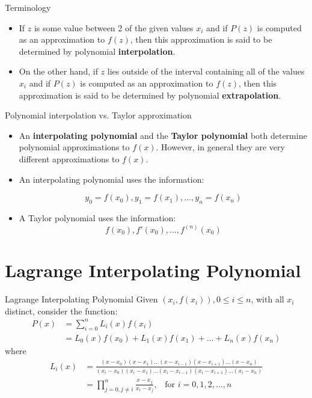 \documentclass[12pt]{beamer}
\begin{document}
\begin{frame}{Terminology}
\begin{itemize} 
\item{If $z$ is some value between 2 of the given values $x_i$ and if $P(z)$ is computed as an approximation to $f(z)$, then this approximation is said to be determined by polynomial {\bf interpolation}.} 
\vspace{0.5 in}
\item{On the other hand, if $z$ lies outside of the interval containing all of the values $x_i$ and if $P(z)$ is computed as an approximation to $f(z)$, then this approximation is said to be determined by polynomial {\bf extrapolation}.}
\end{itemize}
\vspace{1 in}
\end{frame}

\begin{frame}{Polynomial interpolation vs. Taylor approximation} 
\begin{itemize}
\item{An {\bf interpolating polynomial} and the {\bf Taylor polynomial} both determine polynomial approximations to $f(x)$. However, in general they are very different approximations to $f(x)$.} 
\item{An interpolating polynomial uses the information: 

\[
y_0 = f(x_0), y_1 = f(x_1), \dots, y_n = f(x_n)
\]} 
\item{A Taylor polynomial uses the information: 
\[
f(x_0), f'(x_0), \dots, f^{(n)}(x_0)
\]}
\end{itemize}
\vspace{1 in}
\end{frame} 

\section{Lagrange Interpolating Polynomial} 

\begin{frame}{Lagrange Interpolating Polynomial}
Given ${(x_i,f(x_i))}, 0 \leq i \leq n$, with all $x_i$ distinct, consider the function: 
\begin{align*}
P(x) &= \sum_{i=0}^{n} L_i(x) f(x_i) \\
     &= L_0(x) f(x_0) + L_1(x)f(x_1) + \dots + L_n(x)f(x_n)
\end{align*} 
\noindent 
where 
\begin{align*}
L_i(x) &= \frac{(x-x_0)(x-x_1)\dots(x-x_{i-1})(x-x_{i+1})\dots(x-x_n)}{(x_i-x_0)(x_i-x_1)\dots(x_i-x_{i-1})(x_i-x_{i+1})\dots(x_i-x_n)} \\
   &= \prod_{j=0,j \neq i}^{n} \frac{x-x_j}{x_i-x_j}, \;\;\; \mbox{for } i=0,1,2,\dots,n 
\end{align*}
\end{frame}
\end{document}
